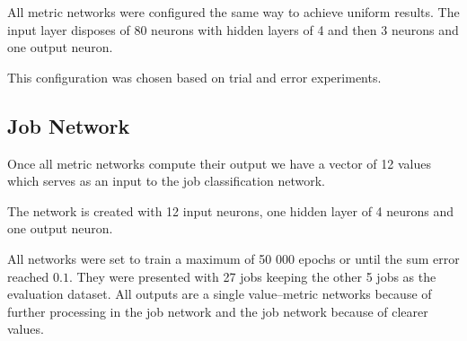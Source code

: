 All metric networks were configured the same way to achieve uniform results. The input layer disposes of 80 neurons with hidden layers of 4 and then 3 neurons and one output neuron.

This configuration was chosen based on trial and error experiments.

\subsection{Job Network}
Once all metric networks compute their output we have a vector of 12 values which serves as an input to the job classification network.

The network is created with 12 input neurons, one hidden layer of 4 neurons and one output neuron.

All networks were set to train a maximum of 50 000 epochs or until the sum error reached $0.1$. They were presented with 27 jobs keeping the other 5 jobs as the evaluation dataset. All outputs are a single value--metric networks because of further processing in the job network and the job network because of clearer values.
